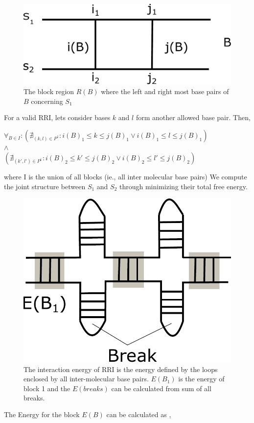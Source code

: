 \documentclass[twoside,a4paper]{report}
\begin{document}
 	\begin{figure}[tb]
 		\includegraphics[width=0.6\linewidth]{block.pdf}
 		\centering
 		\caption{The block region $R(B)$ where the left and right most base pairs of $B$ concerning $S_1$}
 		\label{fig:block}
 	\end{figure}
 	
 	For a valid RRI, lets consider bases $k$ and $l$ form another allowed base pair. Then,
 	
 	\begin{center}
 		 $\forall_{B\in I } : \left(\nexists_{(k,l) \in P^1} : i(B)_1 \le k \le j(B)_1  \vee   i(B)_1 \le l \le j(B)_1 \right) $ \\$\wedge $\\ 	$\left(\nexists_{(k',l') \in P^1} : i(B)_2 \le k' \le j(B)_2  \vee  i(B)_2 \le l' \le j(B)_2\right) $
 	\end{center}
 	
 	where I is the union of all blocks (ie., all inter molecular base pairs)
 	We compute the joint structure between $S_1$ and $S_2$ through minimizing their total free energy. 
	
	\begin{figure}[tb]
		\includegraphics[width=0.5\linewidth]{break.pdf}
		\centering
		\caption{The interaction energy of RRI is the energy defined by the loops enclosed by all inter-molecular base pairs. $E(B_1)$ is the energy of block 1 and the $E(breaks)$ can be calculated from sum of all breaks.  }
		\label{fig:break}
	\end{figure}

		
	 The Energy for the block $E(B)$ can be calculated as  ,
	
\end{document}
